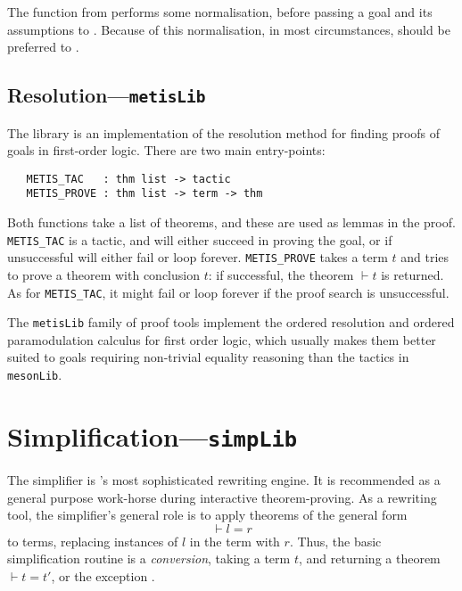 The  function from  performs some
normalisation, before passing a goal and its assumptions to
.  Because of this normalisation, in most
circumstances,  should be preferred to
.

\subsection{Resolution---\texttt{metisLib}}
\label{sec:metisLib}


The  library is an implementation of the resolution method
for finding proofs of goals in first-order logic. There are two main
entry-points:

\begin{hol}
\begin{verbatim}
   METIS_TAC   : thm list -> tactic
   METIS_PROVE : thm list -> term -> thm
\end{verbatim}
\end{hol}

Both functions take a list of theorems, and these are used as lemmas
in the proof. \texttt{METIS\_TAC} is a tactic, and will either succeed
in proving the goal, or if unsuccessful will either fail or loop
forever. \texttt{METIS\_PROVE} takes a term $t$ and tries to prove a
theorem with conclusion $t$: if successful, the theorem $\vdash t$ is
returned. As for \texttt{METIS\_TAC}, it might fail or loop forever if
the proof search is unsuccessful.

The \texttt{metisLib} family of proof tools implement the ordered
resolution and ordered paramodulation calculus for first order logic,
which usually makes them better suited to goals requiring non-trivial
equality reasoning than the tactics in \texttt{mesonLib}.


\section{Simplification---\texttt{simpLib}}
\label{sec:simpLib}

The simplifier is \HOL's most sophisticated rewriting engine.  It is
recommended as a general purpose work-horse during interactive
theorem-proving.  As a rewriting tool, the simplifier's general role
is to apply theorems of the general form
\[
\vdash l = r
\]
to terms, replacing instances of $l$ in the term with $r$. Thus, the
basic simplification routine is a \emph{conversion}, taking a term
$t$, and returning a theorem $\vdash t = t'$, or the exception
.

